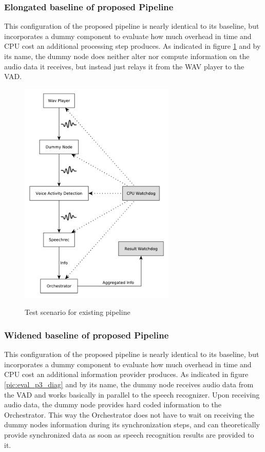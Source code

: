 \subsubsection{Elongated baseline of proposed Pipeline}
This configuration of the proposed pipeline is nearly identical to its baseline, but incorporates a dummy component to evaluate how much overhead in time and CPU cost an additional processing step produces.
As indicated in figure \ref{pic:eval_p4_diag} and by its name, the dummy node does neither alter nor compute information on the audio data it receives, but instead just relays it from the WAV player to the VAD.

\begin{figure}[]
	\centering
	\includegraphics[width=0.66\textwidth]{diagrams/eval_pipeline_4.pdf}
	\label{pic:eval_p4_diag}
	\caption{Test scenario for existing pipeline}
\end{figure}

\subsubsection{Widened baseline of proposed Pipeline}
This configuration of the proposed pipeline is nearly identical to its baseline, but incorporates a dummy component to evaluate how much overhead in time and CPU cost an additional information provider produces.
As indicated in figure \ref{pic:eval_p3_diag} and by its name, the dummy node receives audio data from the VAD and works basically in parallel to the speech recognizer.
Upon receiving audio data, the dummy node provides hard coded information to the Orchestrator.
This way the Orchestrator does not have to wait on receiving the dummy nodes information during its synchronization steps, and can theoretically provide synchronized data as soon as speech recognition results are provided to it.

